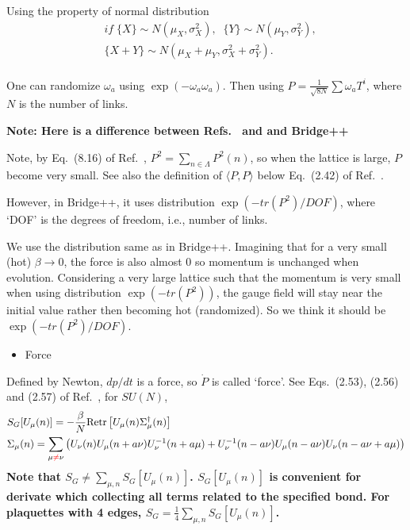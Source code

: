 Using the property of normal distribution
\begin{equation}
\begin{split}
&if\; \{X\}\sim N(\mu _X, \sigma _X^2),\;\; \{Y\}\sim N(\mu _Y, \sigma _Y^2),\\
&\{X+Y\}\sim N(\mu _X+\mu _Y, \sigma _X^2+\sigma _Y^2).\\
\end{split}
\end{equation}

One can randomize $\omega _a$ using $\exp \left(-\omega_a\omega_a\right)$. Then using $P=\frac{1}{\sqrt{8N}}\sum \omega _a T^i$, where $N$ is the number of links.

\textcolor[rgb]{1,0,0}{\textbf{Note: Here is a difference between Refs.~\cite{latticeqcdbook2010} and \cite{latticeqcdbook2017} and Bridge++~\cite{bridge}}}

Note, by Eq.~(8.16) of Ref.~\cite{latticeqcdbook2010}, $P^2=\sum _{n\in \Lambda}P^2(n)$, so when the lattice is large, $P$ become very small. See also the definition of $\langle P,P\rangle$ below Eq.~(2.42) of Ref.~\cite{latticeqcdbook2017}.

However, in Bridge++, it uses distribution $\exp \left(-tr(P^2)/DOF\right)$, where `DOF' is the degrees of freedom, i.e., number of links.

We use the distribution same as in Bridge++. Imagining that for a very small (hot) $\beta \to 0$, the force is also almost $0$ so momentum is unchanged when evolution. Considering a very large lattice such that the momentum is very small when using distribution $\exp \left(-tr(P^2)\right)$, the gauge field will stay near the initial value rather then becoming hot (randomized). So we think it should be $\exp \left(-tr(P^2)/DOF\right)$.

\begin{itemize}
\item {}Force
\end{itemize}

Defined by Newton, $dp/dt$ is a force, so $\dot{P}$ is called `force'. See Eqs.~(2.53), (2.56) and (2.57) of Ref.~\cite{latticeqcdbook2017}, for $SU(N)$,
\begin{equation}
\begin{split}
&S_G[U_{\mu}(n)]=-\frac{\beta}{N}{\rm Re}{\rm tr}\left[U_{\mu}(n)\Sigma ^{\dagger}_{\mu}(n)\right]\\
&\Sigma _{\mu}(n)=\sum _{\mu \textcolor[rgb]{1,0,0}{\neq}\nu}\left(U_{\nu}(n)U_{\mu}(n+a\nu)U^{-1}_{\nu}(n+a\mu)+U^{-1}_{\nu}(n-a\nu)U_{\mu}(n-a\nu)U_{\nu}(n-a\nu+a\mu)\right)\\
\end{split}
\label{eq.hmc.staple}
\end{equation}
\textbf{Note that $S_G\neq \sum _{\mu,n} S_G[U_{\mu}(n)]$. $S_G[U_{\mu}(n)]$ is convenient for derivate which collecting all terms related to the specified bond. For plaquettes with 4 edges, $S_G=\frac{1}{4} \sum _{\mu,n} S_G[U_{\mu}(n)]$. }

